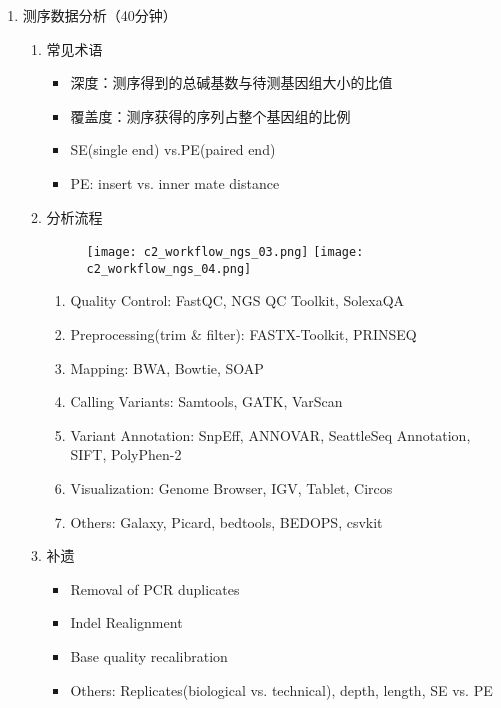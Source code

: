 \documentclass{TIJMUjiaoanLL}
\begin{document}
\begin{enumerate}
  \item 测序数据分析（40分钟）
    \begin{enumerate}
      \item 常见术语
        \begin{itemize}
          \item 深度：测序得到的总碱基数与待测基因组大小的比值
          \item 覆盖度：测序获得的序列占整个基因组的比例
          \item SE(single end) vs.PE(paired end)
          \item PE: insert vs. inner mate distance
        \end{itemize}
      \item 分析流程
            \vspace{-0.5em}
            \begin{figure}[h]
              \centering
              \texttt{[image: c2\_workflow\_ngs\_03.png]}
              \quad
              \texttt{[image: c2\_workflow\_ngs\_04.png]}
            \end{figure}
            \vspace{-0.5em}
            \begin{enumerate}
              \item Quality Control: FastQC, NGS QC Toolkit, SolexaQA
              \item Preprocessing(trim \& filter): FASTX-Toolkit, PRINSEQ
              \item Mapping: BWA, Bowtie, SOAP
              \item Calling Variants: Samtools, GATK, VarScan
              \item Variant Annotation: SnpEff, ANNOVAR, SeattleSeq Annotation, SIFT, PolyPhen-2
              \item Visualization: Genome Browser, IGV, Tablet, Circos
              \item Others: Galaxy, Picard, bedtools, BEDOPS, csvkit
            \end{enumerate}
      \item 补遗
        \begin{itemize}
          \item Removal of PCR duplicates
          \item Indel Realignment
          \item Base quality recalibration
          \item Others: Replicates(biological vs. technical), depth, length, SE vs. PE
        \end{itemize}
    \end{enumerate}


\end{enumerate}
\end{document}
